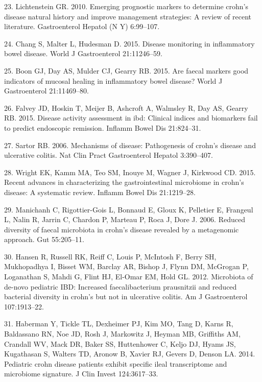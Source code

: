 \documentclass[12pt,]{article}
\begin{document}
\hypertarget{ref-Lichtenstein_biomarkers_2010}{}
23. Lichtenstein GR. 2010. Emerging prognostic markers to determine
crohn's disease natural history and improve management strategies: A
review of recent literature. Gastroenterol Hepatol (N Y) 6:99--107.

\hypertarget{ref-Chang_biomarkers_2015}{}
24. Chang S, Malter L, Hudesman D. 2015. Disease monitoring in
inflammatory bowel disease. World J Gastroenterol 21:11246--59.

\hypertarget{ref-Boon_biomarkers_2015}{}
25. Boon GJ, Day AS, Mulder CJ, Gearry RB. 2015. Are faecal markers good
indicators of mucosal healing in inflammatory bowel disease? World J
Gastroenterol 21:11469--80.

\hypertarget{ref-Falvey_biomarkers_2015}{}
26. Falvey JD, Hoskin T, Meijer B, Ashcroft A, Walmsley R, Day AS,
Gearry RB. 2015. Disease activity assessment in ibd: Clinical indices
and biomarkers fail to predict endoscopic remission. Inflamm Bowel Dis
21:824--31.

\hypertarget{ref-sartor_IBDpath_2006}{}
27. Sartor RB. 2006. Mechanisms of disease: Pathogenesis of crohn's
disease and ulcerative colitis. Nat Clin Pract Gastroenterol Hepatol
3:390--407.

\hypertarget{ref-wright_CDmicrobiome_2015}{}
28. Wright EK, Kamm MA, Teo SM, Inouye M, Wagner J, Kirkwood CD. 2015.
Recent advances in characterizing the gastrointestinal microbiome in
crohn's disease: A systematic review. Inflamm Bowel Dis 21:1219--28.

\hypertarget{ref-manichanh_diversityCD_2006}{}
29. Manichanh C, Rigottier-Gois L, Bonnaud E, Gloux K, Pelletier E,
Frangeul L, Nalin R, Jarrin C, Chardon P, Marteau P, Roca J, Dore J.
2006. Reduced diversity of faecal microbiota in crohn's disease revealed
by a metagenomic approach. Gut 55:205--11.

\hypertarget{ref-hansen_pedsIBD_2012}{}
30. Hansen R, Russell RK, Reiff C, Louis P, McIntosh F, Berry SH,
Mukhopadhya I, Bisset WM, Barclay AR, Bishop J, Flynn DM, McGrogan P,
Loganathan S, Mahdi G, Flint HJ, El-Omar EM, Hold GL. 2012. Microbiota
of de-novo pediatric IBD: Increased faecalibacterium prausnitzii and
reduced bacterial diversity in crohn's but not in ulcerative colitis. Am
J Gastroenterol 107:1913--22.

\hypertarget{ref-haberman_pedsCD_2014}{}
31. Haberman Y, Tickle TL, Dexheimer PJ, Kim MO, Tang D, Karns R,
Baldassano RN, Noe JD, Rosh J, Markowitz J, Heyman MB, Griffiths AM,
Crandall WV, Mack DR, Baker SS, Huttenhower C, Keljo DJ, Hyams JS,
Kugathasan S, Walters TD, Aronow B, Xavier RJ, Gevers D, Denson LA.
2014. Pediatric crohn disease patients exhibit specific ileal
transcriptome and microbiome signature. J Clin Invest 124:3617--33.
\end{document}
